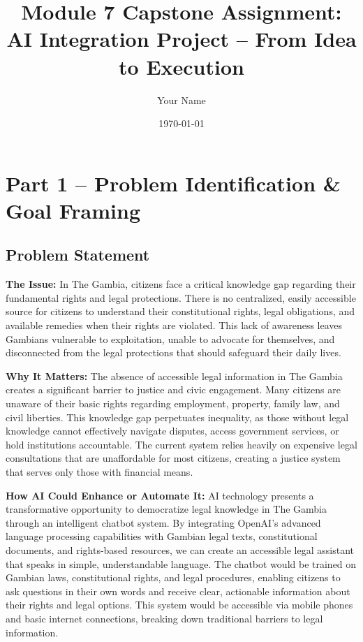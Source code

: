 \documentclass[12pt]{article}
\title{\textbf{Module 7 Capstone Assignment: AI Integration Project – From Idea to Execution}}
\author{Your Name}
\date{\today}
\begin{document}
\maketitle

\section{Part 1 – Problem Identification \& Goal Framing}

\subsection{Problem Statement}

\textbf{The Issue:} In The Gambia, citizens face a critical knowledge gap regarding their fundamental rights and legal protections. There is no centralized, easily accessible source for citizens to understand their constitutional rights, legal obligations, and available remedies when their rights are violated. This lack of awareness leaves Gambians vulnerable to exploitation, unable to advocate for themselves, and disconnected from the legal protections that should safeguard their daily lives.

\textbf{Why It Matters:} The absence of accessible legal information in The Gambia creates a significant barrier to justice and civic engagement. Many citizens are unaware of their basic rights regarding employment, property, family law, and civil liberties. This knowledge gap perpetuates inequality, as those without legal knowledge cannot effectively navigate disputes, access government services, or hold institutions accountable. The current system relies heavily on expensive legal consultations that are unaffordable for most citizens, creating a justice system that serves only those with financial means.

\textbf{How AI Could Enhance or Automate It:} AI technology presents a transformative opportunity to democratize legal knowledge in The Gambia through an intelligent chatbot system. By integrating OpenAI's advanced language processing capabilities with Gambian legal texts, constitutional documents, and rights-based resources, we can create an accessible legal assistant that speaks in simple, understandable language. The chatbot would be trained on Gambian laws, constitutional rights, and legal procedures, enabling citizens to ask questions in their own words and receive clear, actionable information about their rights and legal options. This system would be accessible via mobile phones and basic internet connections, breaking down traditional barriers to legal information.
\end{document}
